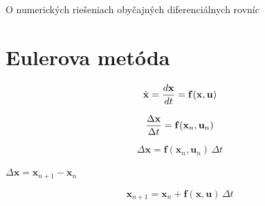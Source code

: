 \documentclass[a4paper, 10pt, ]{article}
\begin{document}
\begin{flushleft}
	O numerických riešeniach obyčajných diferenciálnych rovníc
\end{flushleft}

\bigskip

\normalsize
\normalfont



\section{Eulerova metóda}

\begin{equation}
    \dot{\mathbf{x}} = \frac{d \mathbf{x}}{d t} = \mathbf{f}(\mathbf{x}, \mathbf{u})
\end{equation}

\begin{equation}
    \frac{\Delta \mathbf{x}}{\Delta t} = \mathbf{f}(\mathbf{x}_{n}, \mathbf{u}_{n})
\end{equation}

\begin{equation}
    \Delta \bm{x} = \bm{f}(\bm{x}_{n}, \bm{u}_{n}) \, \Delta t
\end{equation}

$\Delta \bm{x} = \bm{x}_{n + 1} - \bm{x}_{n}$

\begin{equation}
    \bm{x}_{n + 1} = \bm{x}_{n} + \bm{f}(\bm{x}, \bm{u}) \, \Delta t
\end{equation}
\end{document}
